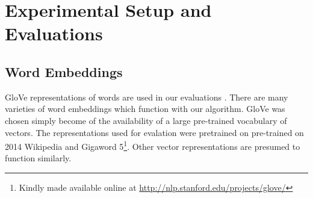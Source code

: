 \documentclass[11pt]{article}
\theoremstyle{plain}
\theoremstyle{definition}
\begin{document}
\begin{comment}
Even with these techniques to decrease the time taken, running the search over long sentences takes significant amount of time: on the order of 10 seconds for a sentence with 18 words, and increasing rapidly. For this reason the ordering step is only carried out for the BOWs corresponding to reference sentences with no more than 18 words.
 
  
Of course, for some sentences the BOW can not always be resolved to the correct ordering -- when some words can be swapped in position and still have a valid and likely sentence. For example ``Show me flights from London to New York.'' is just as reasonable as  ``Show me flights from New York to London.''. On the other hand often one ordering is far more likely and reasonable than the others, "The dog chased the cat." is much more often correct than "The cat chased the dog.", it is also preferable over "The cat the dog chased." though all three are grammatically correct. It is assumed here that, for most bags of words there is one ordering that is far far more likely to occur than the others, and thus is the correct ordering. The results for the Oracle BOW in the next section suggest this assumption is largely correct -- at least for the Brown Corpus.

\end{comment}



\section{Experimental Setup and Evaluations} \label{evalsettings}

\subsection{Word Embeddings}
GloVe representations of words are used in our evaluations \parencite{pennington2014glove}. There are many varieties of word embeddings which function with our algorithm. GloVe was chosen simply become of the availability of a large pre-trained vocabulary of vectors. The representations used for evalation were pretrained on pre-trained on 2014 Wikipedia and Gigaword 5\footnote{Kindly made available online at \url{http://nlp.stanford.edu/projects/glove/}}.  Other vector representations are presumed to function similarly.
\end{document}
